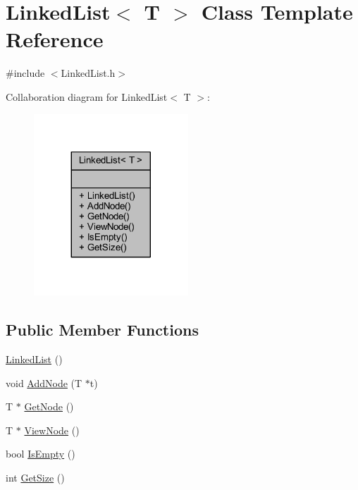 \hypertarget{class_linked_list}{}\section{Linked\+List$<$ T $>$ Class Template Reference}
\label{class_linked_list}


{\ttfamily \#include $<$Linked\+List.\+h$>$}



Collaboration diagram for Linked\+List$<$ T $>$\+:\nopagebreak
\begin{figure}[H]
\begin{center}
\leavevmode
\includegraphics[width=164pt]{class_linked_list__coll__graph}
\end{center}
\end{figure}
\subsection*{Public Member Functions}
\begin{DoxyCompactItemize}
\item 
\hyperlink{class_linked_list_a3c20fcfec867e867f541061a09fc640c}{Linked\+List} ()
\item 
void \hyperlink{class_linked_list_aa0846665f0375a005b79631142eec7fb}{Add\+Node} (T $\ast$t)
\item 
T $\ast$ \hyperlink{class_linked_list_a94a6f58f1b437c08d398c3c5d6b038e1}{Get\+Node} ()
\item 
T $\ast$ \hyperlink{class_linked_list_a926040c8f7faa215988def48e41797e5}{View\+Node} ()
\item 
bool \hyperlink{class_linked_list_ac5a0d903d22d1157e98b6d3c182e1c74}{Is\+Empty} ()
\item 
int \hyperlink{class_linked_list_a2ec266fa30f649a81f930eff858a030f}{Get\+Size} ()
\end{DoxyCompactItemize}


